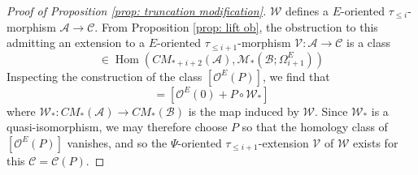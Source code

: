 \documentclass[10pt,a4paper]{amsart}
\newcommand{\cA}{\mathcal{A}}
\newcommand{\cB}{\mathcal{B}}
\newcommand{\cC}{\mathcal{C}}
\newcommand{\cM}{\mathcal{M}}
\newcommand{\cO}{\mathcal{O}}
\newcommand{\cV}{\mathcal{V}}
\newcommand{\cW}{\mathcal{W}}
\begin{document}
\begin{proof}[Proof of Proposition \ref{prop: truncation modification}]
        $\cW$ defines a $E$-oriented $\tau_{\leq i}$-morphism $\cA \to \cC$. From Proposition \ref{prop: lift ob}, the obstruction to this admitting an extension to a $E$-oriented $\tau_{\leq i+1}$-morphism $\cV: \cA \to \cC$ is a class
        \begin{equation}
            [\cO^E(P)] \in \operatorname{Hom}\left(CM_{*+i+2}(\cA), \cM_{*}(\cB; \Omega^{E}_{i+1}) \right)
        \end{equation}
        Inspecting the construction of the class $[\cO^E(P)]$, we find that
        \begin{equation}
            [\cO^E(P)] = [\cO^E(0) + P \circ \cW_*]
        \end{equation}
        where $\cW_*: CM_*(\cA) \to CM_*(\cB)$ is the map induced by $\cW$. Since $\cW_*$ is a quasi-isomorphism, we may therefore choose $P$ so that the homology class of $[\cO^E(P)]$ vanishes, and so the $\Psi$-oriented $\tau_{\leq i+1}$-extension $\cV$ of $\cW$ exists for this $\cC=\cC(P)$.
    \end{proof}
\end{document}
